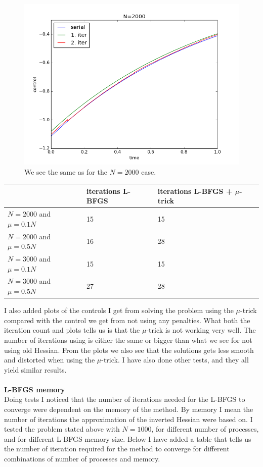 \documentclass[11pt,a4paper]{report}
\begin{document}
\begin{figure}
  \includegraphics[width=\linewidth]{mufail2000.png}
  \caption{We see the same as for the $N=2000$ case. }
  \label{Fig 2}
\end{figure}
\begin{center}
    \begin{tabular}{| l | l | l |}
    \hline
     & iterations L-BFGS & iterations  L-BFGS + $\mu$-trick \\ \hline
    $N=2000$ and $\mu=0.1N$ &  15 & 15 \\ \hline
    $N=2000$ and $\mu=0.5N$&  16 &  28	\\ \hline
    $N=3000$ and $\mu=0.1N$ &  15 & 15 \\ \hline
    $N=3000$ and $\mu=0.5N$&  27 &  28	\\ \hline
    \end{tabular}
\end{center}
I also added plots of the controls I get from solving the problem using the $\mu$-trick compared with the control we get from not using any penalties. What both the iteration count and plots tells us is that the $\mu$-trick is not working very well. The number of iterations using is either the same or bigger than what we see for not using old Hessian. From the plots we also see that the solutions gets less smooth and distorted when using the $\mu$-trick. I have also done other tests, and they all yield similar results. 
\\
\\
\textbf{L-BFGS memory}
\\
Doing tests I noticed that the number of iterations needed for the L-BFGS to converge were dependent on the memory of the method. By memory I mean the number of iterations the approximation of the inverted Hessian were based on. I tested the problem stated above with $N=1000$, for different number of processes, and for different L-BFGS memory size. Below I have added a table that tells us the number of iteration required for the method to converge for different combinations of number of processes and memory.
\end{document}
